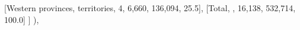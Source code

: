 \documentclass[
  11pt,
  a4paper,
]{article}
\newenvironment{Shaded}{\begin{snugshade}}{\end{snugshade}}
\newcommand{\NormalTok}[1]{\textcolor[rgb]{0.00,0.23,0.31}{#1}}
\newcommand{\StringTok}[1]{\textcolor[rgb]{0.13,0.47,0.30}{#1}}
\begin{document}
\begin{Shaded}
\begin{Highlighting}[]
\NormalTok{                    [}\StringTok{\textquotesingle{}Western provinces, territories\textquotesingle{}}\NormalTok{, }\StringTok{\textquotesingle{}4\textquotesingle{}}\NormalTok{, }\StringTok{\textquotesingle{}6,660\textquotesingle{}}\NormalTok{, }\StringTok{\textquotesingle{}136,094\textquotesingle{}}\NormalTok{, }\StringTok{\textquotesingle{}25.5\textquotesingle{}}\NormalTok{],}
\NormalTok{                    [}\StringTok{\textquotesingle{}Total\textquotesingle{}}\NormalTok{, }\StringTok{\textquotesingle{}\textquotesingle{}}\NormalTok{, }\StringTok{\textquotesingle{}16,138\textquotesingle{}}\NormalTok{, }\StringTok{\textquotesingle{}532,714\textquotesingle{}}\NormalTok{, }\StringTok{\textquotesingle{}100.0\textquotesingle{}}\NormalTok{]}
\NormalTok{                ]}
\NormalTok{            ),}
            

\end{Highlighting}
\end{Shaded}
\end{document}
